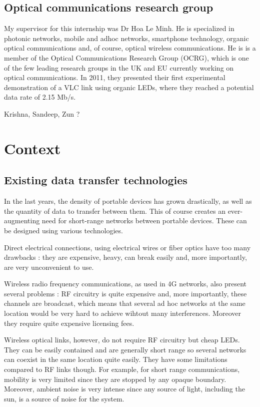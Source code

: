 \documentclass[12pt]{report}
\begin{document}
\subsection{Optical communications research group}

My supervisor for this internship was Dr Hoa Le Minh. He is specialized in photonic networks, mobile and adhoc networks, smartphone technology, organic optical communications and, of course, optical wireless communications.
He is  is a member of the Optical Communications Research Group (OCRG), which is one of the few leading research groups in the UK and EU currently working on optical communications. In 2011, they presented their first experimental demonstration of a VLC link using organic LEDs, where they reached a potential data rate of 2.15 Mb/s.

Krishna, Sandeep, Zun ?



\section{Context}

\subsection{Existing data transfer technologies}

In the last years, the density of portable devices has grown drastically, as well as the quantity of data to transfer between them. This of course creates an ever-augmenting need for short-range networks between portable devices.  These can be designed using various technologies.

Direct electrical connections, using electrical wires or fiber optics have too many drawbacks : they are expensive, heavy, can break easily and, more importantly, are very unconvenient to use.

Wireless radio frequency communications, as used in 4G networks, also present several problems : RF circuitry is quite expensive and, more importantly, these channels are broadcast, which means that several ad hoc networks at the same location would be very hard to achieve wihtout many interferences. Moreover they require quite expensive licensing fees.

Wireless optical links, however, do not require RF circuitry but cheap LEDs. They can be easily contained and are generally short range so several networks can coexist in the same location quite easily. They have some limitations compared to RF links though. For example, for short range communications, mobility is very limited since they are stopped by any opaque boundary. Moreover, ambient noise is very intense since any source of light, including the sun, is a source of noise for the system.
\end{document}
